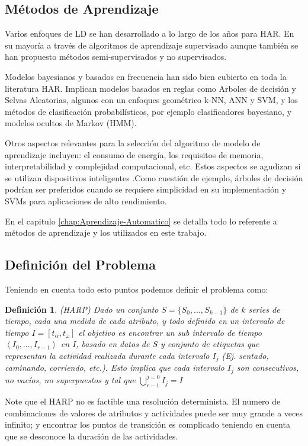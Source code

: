 \subsection{Métodos de Aprendizaje}
Varios enfoques de LD se han desarrollado a lo largo de los años para HAR. En su mayoría a través de algoritmos de aprendizaje supervisado aunque también se han propuesto métodos semi-supervisados y no supervisados.

Modelos bayesianos y basados en frecuencia han sido bien cubierto en toda la literatura HAR. Implican modelos basados en reglas como Arboles de decisión y Selvas Aleatorias, algunos con un enfoques geométrico k-NN, ANN y SVM, y los métodos de clasificación probabilísticos, por ejemplo clasificadores bayesiano, y modelos ocultos de Markov (HMM).

Otros aspectos relevantes para la selección del algoritmo de modelo de aprendizaje incluyen: el consumo de energía, los requisitos de memoria, interpretabilidad y complejidad computacional, etc. Estos aspectos se agudizan si se utilizan dispositivos inteligentes .Como cuestión de ejemplo, árboles de decisión podrían ser preferidos cuando se requiere simplicidad en su implementación y SVMs para aplicaciones de alto rendimiento.

En el capitulo \ref{chap:Aprendizaje-Automatico} se detalla todo lo referente a métodos de aprendizaje y los utilizados en este trabajo.

\subsection{Definición del Problema}
Teniendo en cuenta todo esto puntos podemos definir el problema como:

\newtheorem{defi}{Definición}

\begin{defi}(HARP)
	Dado un conjunto $S = \{S_{0},...,S_{k-1}\} $ de $k$ series de tiempo, cada una medida de cada atributo, y todo definido en un intervalo de tiempo $I =  \left [ t_{\alpha}, t_{\omega} \right ]$ el objetivo es encontrar un sub intervalo de tiempo $\left\langle I_{0},...,I_{r-1} \right\rangle $ en $I$, basado en datos de $S$ y conjunto de etiquetas que representan la actividad realizada durante cada intervalo $I_{j}$ (Ej. sentado, caminando, corriendo, etc.). Esto implica que cada intervalo $I_{j}$ son consecutivos, no vacíos, no superpuestos y tal que $ \displaystyle\bigcup_{r-1}^{j=0}{I_j = I } $
\end{defi}

Note que el HARP no es factible una resolución determinista. El numero de combinaciones de valores de atributos y actividades puede ser muy grande a veces infinito; y encontrar los puntos de transición es complicado teniendo en cuenta que se desconoce la duración de las actividades.

